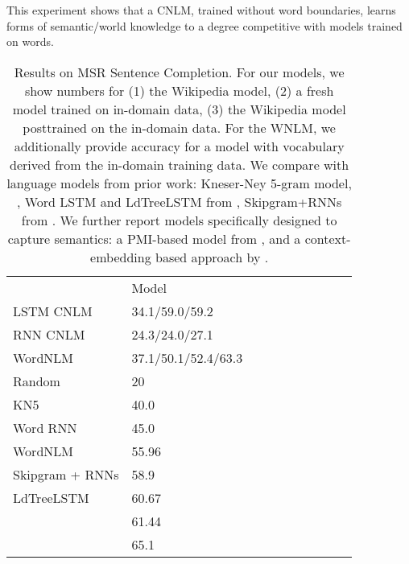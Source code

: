 This experiment shows that a CNLM, trained without word boundaries, learns forms of semantic/world knowledge to a degree competitive with models trained on words.

\begin{table}[t]
  \begin{center}
    \begin{tabular}{l|l|l|l|llllll}
      \multicolumn{1}{c}{}& Model \\
LSTM CNLM	    &      34.1/59.0/59.2 \\
	    RNN CNLM &     24.3/24.0/27.1 \\
	    WordNLM & 37.1/50.1/52.4/63.3 \\ \hline
	    Random & 20 \\
	    KN5   & 40.0 \\
            Word RNN & 45.0 \\
	    WordNLM  & 55.96 \\
Skipgram + RNNs  & 58.9 \\
LdTreeLSTM  & 60.67 \\
            \citet{woods2016exploiting} &  61.44 \\
\citet{melamud2016context2vec} & 65.1 \\
    \end{tabular}
  \end{center}
	\caption{\label{tab:msr-completion-results} Results on MSR Sentence Completion. For our models, we show numbers for (1) the Wikipedia model, (2) a fresh model trained on in-domain data, (3) the Wikipedia model posttrained on the in-domain data. For the WNLM, we additionally provide accuracy for a model with vocabulary derived from the in-domain training data. We compare with language models from prior work: Kneser-Ney 5-gram model, , Word LSTM and LdTreeLSTM from , Skipgram+RNNs from . We further report models specifically designed to capture semantics: a PMI-based model from \citet{woods2016exploiting}, and a context-embedding based approach by \citet{melamud2016context2vec}.}
\end{table}



